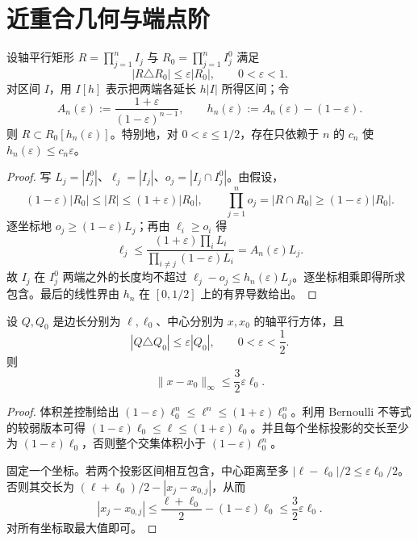 \section{近重合几何与端点阶}
\label{sec:geometry}

\begin{lemma}[近重合矩形]
\label{geo:rectangles}
设轴平行矩形 $R=\prod_{j=1}^nI_j$ 与 $R_0=\prod_{j=1}^nI_j^0$ 满足
\[
 |R\triangle R_0|\leq\varepsilon|R_0|,\qquad0<\varepsilon<1.
\]
对区间 $I$，用 $I[h]$ 表示把两端各延长 $h|I|$ 所得区间；令
\[
 A_n(\varepsilon):=\frac{1+\varepsilon}{(1-\varepsilon)^{n-1}},
 \qquad h_n(\varepsilon):=A_n(\varepsilon)-(1-\varepsilon).
\]
则 $R\subset R_0[h_n(\varepsilon)]$。特别地，对 $0<\varepsilon\leq1/2$，存在只依赖于 $n$ 的 $c_n$ 使 $h_n(\varepsilon)\leq c_n\varepsilon$。
\end{lemma}

\begin{proof}
写 $L_j=|I_j^0|$、$\ell_j=|I_j|$、$o_j=|I_j\cap I_j^0|$。由假设，
\[
 (1-\varepsilon)|R_0|\leq|R|\leq(1+\varepsilon)|R_0|,
 \qquad \prod_{j=1}^no_j=|R\cap R_0|\geq(1-\varepsilon)|R_0|.
\]
逐坐标地 $o_j\geq(1-\varepsilon)L_j$；再由 $\ell_i\geq o_i$ 得
\[
 \ell_j\leq\frac{(1+\varepsilon)\prod_iL_i}
 {\prod_{i\ne j}(1-\varepsilon)L_i}=A_n(\varepsilon)L_j.
\]
故 $I_j$ 在 $I_j^0$ 两端之外的长度均不超过
$\ell_j-o_j\leq h_n(\varepsilon)L_j$。逐坐标相乘即得所求包含。最后的线性界由 $h_n$ 在 $[0,1/2]$ 上的有界导数给出。
\end{proof}

\begin{lemma}[近重合中心方体]
\label{geo:centered-cubes}
设 $Q,Q_0$ 是边长分别为 $\ell,\ell_0$、中心分别为 $x,x_0$ 的轴平行方体，且
\[
 |Q\triangle Q_0|\leq\varepsilon|Q_0|,\qquad0<\varepsilon<\frac12.
\]
则
\[
 \|x-x_0\|_\infty\leq\frac32\varepsilon\ell_0.
\]
\end{lemma}

\begin{proof}
体积差控制给出 $(1-\varepsilon)\ell_0^n\leq\ell^n\leq(1+\varepsilon)\ell_0^n$。利用 Bernoulli 不等式的较弱版本可得
$(1-\varepsilon)\ell_0\leq\ell\leq(1+\varepsilon)\ell_0$。并且每个坐标投影的交长至少为 $(1-\varepsilon)\ell_0$，否则整个交集体积小于 $(1-\varepsilon)\ell_0^n$。

固定一个坐标。若两个投影区间相互包含，中心距离至多 $|\ell-\ell_0|/2\leq\varepsilon\ell_0/2$。否则其交长为 $(\ell+\ell_0)/2-|x_j-x_{0,j}|$，从而
\[
 |x_j-x_{0,j}|\leq\frac{\ell+\ell_0}{2}-(1-\varepsilon)\ell_0
 \leq\frac32\varepsilon\ell_0.
\]
对所有坐标取最大值即可。
\end{proof}

